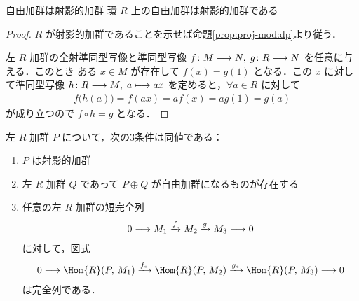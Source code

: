 \documentclass[algtopo_main]{subfiles}
\begin{document}
\begin{mycol}[label=col:free-proj]{自由加群は射影的加群}
    環 $R$ 上の自由加群は射影的加群である
\end{mycol}

\begin{proof}
    $R$ が射影的加群であることを示せば命題\ref{prop:proj-mod:dp}より従う．

    左 $R$ 加群の全射準同型写像と準同型写像 $f \colon M \longrightarrow N,\; g\colon R \longrightarrow N$ を任意に与える．このとき
    ある $x \in M$ が存在して $f(x) = g(1)$ となる．この $x$ に対して準同型写像 $h \colon R \longrightarrow M,\; a \longmapsto ax$ を定めると，$\forall a \in R$ に対して
    \begin{align}
        f \bigl( h(a) \bigr)  = f(ax) = af(x) = ag(1) = g(a)
    \end{align}
    が成り立つので $f \circ h = g$ となる．
\end{proof}

\begin{myprop}[label=prop:proj-mod-basic]{}
    左 $R$ 加群 $P$ について，次の3条件は同値である：
    \begin{enumerate}
        \item $P$ は\hyperref[def:proj-mod]{射影的加群}
        \item 左 $R$ 加群 $Q$ であって $P \oplus Q$ が自由加群になるものが存在する
        \item 任意の左 $R$ 加群の短完全列
        \begin{align}
            0 \longrightarrow M_1 \xrightarrow{f} M_2 \xrightarrow{g} M_3 \longrightarrow 0
        \end{align}
        に対して，図式
        \begin{align}
            \label{eq:prop-proj-hom}
            0 \lto \Hom{R} (P,\, M_1) \xrightarrow{f_*} \Hom{R}(P,\, M_2) \xrightarrow{g_*} \Hom{R}(P,\, M_3) \lto 0
        \end{align}
        は完全列である．
    \end{enumerate}
\end{myprop}
\end{document}
